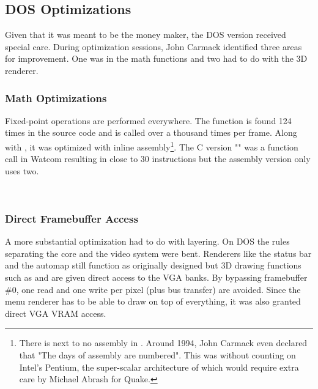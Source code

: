 \subsection{DOS Optimizations}
Given that it was meant to be the money maker, the DOS version received special care. During optimization sessions, John Carmack identified three areas for improvement. One was in the math functions and two had to do with the 3D renderer.\\
 \par
\par




\subsubsection{Math Optimizations}
Fixed-point operations are performed everywhere. The function  is found 124 times in the source code and is called over a thousand times per frame. Along with , it was optimized with inline assembly\footnote{There is next to no assembly in \doom. Around 1994, John Carmack even declared that "The days of assembly are numbered". This was without counting on Intel's Pentium, the super-scalar architecture of which would require extra care by Michael Abrash for Quake.}. The C version "" was a function call in Watcom resulting in close to 30 instructions but the assembly version only uses two.\\
\par
{}\\


\vspace{-2mm}
\subsubsection{Direct Framebuffer Access}
A more substantial optimization had to do with layering. On DOS the rules separating the core and the video system were bent. Renderers like the status bar and the automap still function as originally designed but 3D drawing functions such as  and  are given direct access to the VGA banks. By bypassing framebuffer \#0, one read and one write per pixel (plus bus transfer) are avoided. Since the menu renderer has to be able to draw on top of everything, it was also granted direct VGA VRAM access.\\

